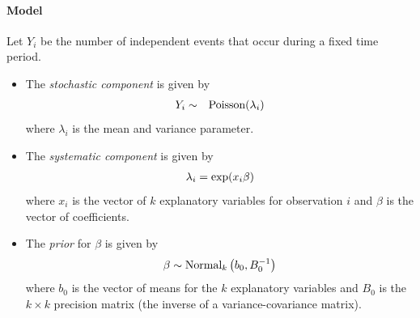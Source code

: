 \documentclass[letterpaper,10pt,english]{sphinxmanual}
\begin{document}
\paragraph{Model}
\label{zelig-poissonbayes:model}
Let \(Y_{i}\) be the number of independent events that occur during
a fixed time period.
\begin{itemize}
\item {} 
The \emph{stochastic component} is given by
\begin{gather}
\begin{split}\begin{aligned}
Y_{i}  &  \sim & \textrm{Poisson}(\lambda_i)\end{aligned}\end{split}\notag
\end{gather}
where \(\lambda_i\) is the mean and variance parameter.

\item {} 
The \emph{systematic component} is given by
\begin{gather}
\begin{split}\begin{aligned}
\lambda_{i}= \exp(x_{i} \beta)\end{aligned}\end{split}\notag
\end{gather}
where \(x_{i}\) is the vector of \(k\) explanatory variables
for observation \(i\) and \(\beta\) is the vector of
coefficients.

\item {} 
The \emph{prior} for \(\beta\) is given by
\begin{gather}
\begin{split}\begin{aligned}
\beta \sim \textrm{Normal}_k \left(  b_{0},B_{0}^{-1}\right)\end{aligned}\end{split}\notag
\end{gather}
where \(b_{0}\) is the vector of means for the \(k\)
explanatory variables and \(B_{0}\) is the \(k \times k\)
precision matrix (the inverse of a variance-covariance matrix).

\end{itemize}
\end{document}
